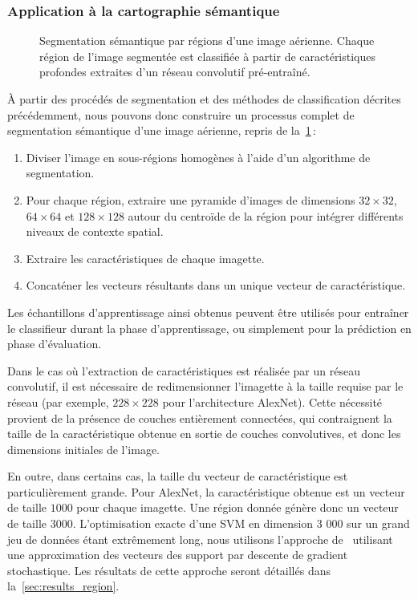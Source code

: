 \subsubsection{Application à la cartographie sémantique}

\begin{figure}
\resizebox{\textwidth}{!}{%

}
\caption{Segmentation sémantique par régions d'une image aérienne. Chaque région de l'image segmentée est classifiée à partir de caractéristiques profondes extraites d'un réseau convolutif pré-entraîné.}
\label{fig:framework}
\end{figure}

À partir des procédés de segmentation et des méthodes de classification décrites précédemment, nous pouvons donc construire un processus complet de segmentation sémantique d'une image aérienne, repris de la~\cref{fig:framework}\,:
\begin{enumerate}
    \item Diviser l'image en sous-régions homogènes à l'aide d'un algorithme de segmentation.
    \item Pour chaque région, extraire une pyramide d'images de dimensions $32\times32$, $64\times64$ et $128\times128$ autour du centroïde de la région pour intégrer différents niveaux de contexte spatial.
    \item Extraire les caractéristiques de chaque imagette.
    \item Concaténer les vecteurs résultants dans un unique vecteur de caractéristique.
\end{enumerate}

Les échantillons d'apprentissage ainsi obtenus peuvent être utilisés pour entraîner le classifieur durant la phase d'apprentissage, ou simplement pour la prédiction en phase d'évaluation.

Dans le cas où l'extraction de caractéristiques est réalisée par un réseau convolutif, il est nécessaire de redimensionner l'imagette à la taille requise par le réseau (par exemple, $228\times228$ pour l'architecture AlexNet). Cette nécessité provient de la présence de couches entièrement connectées, qui contraignent la taille de la caractéristique obtenue en sortie de couches convolutives, et donc les dimensions initiales de l'image.

En outre, dans certains cas, la taille du vecteur de caractéristique est particulièrement grande. Pour AlexNet, la caractéristique obtenue est un vecteur de taille $1 000$ pour chaque imagette. Une région donnée génère donc un vecteur de taille $3 000$. L'optimisation exacte d'une \gls{SVM} en dimension 3 000 sur un grand jeu de données étant extrêmement long, nous utilisons l'approche de~\citet{bottou_large-scale_2010} utilisant une approximation des vecteurs des support par descente de gradient stochastique. Les résultats de cette approche seront détaillés dans la~\cref{sec:results_region}.

